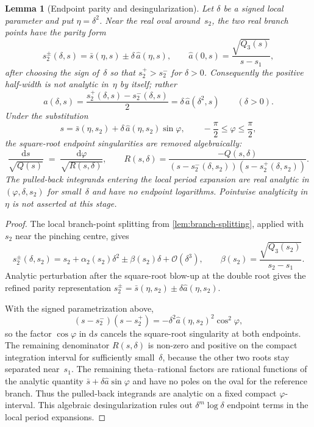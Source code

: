 \documentclass[11pt,a4paper]{article}
\theoremstyle{plain}
\newtheorem{lemma}[theorem]{Lemma}
\theoremstyle{definition}
\theoremstyle{remark}
\newcommand{\dd}{\mathrm{d}}
\newcommand{\Oo}{\mathcal{O}}
\begin{document}
\begin{lemma}[Endpoint parity and desingularization]%
\label{lem:smooth}
  Let $\delta$ be a signed local parameter and put $\eta=\delta^2$.
  Near the real oval around~$s_2$, the two real branch points have
  the parity form
  \[
    s_2^\pm(\delta,s)
    =
    \bar s(\eta,s)\pm\delta\,\widehat a(\eta,s),
    \qquad
    \widehat a(0,s)=\frac{\sqrt{Q_3(s)}}{s-s_1},
  \]
  after choosing the sign of~$\delta$ so that
  $s_2^+>s_2^-$ for $\delta>0$.  Consequently the positive
  half-width is not analytic in~$\eta$ by itself; rather
  \[
    a(\delta,s)=\frac{s_2^+(\delta,s)-s_2^-(\delta,s)}{2}
    =\delta\,\widehat a(\delta^2,s)
    \qquad(\delta>0).
  \]
  Under the substitution
  \[
    s=\bar s(\eta,s_2)+\delta\,\widehat a(\eta,s_2)\sin\varphi,
    \qquad -\frac{\pi}{2}\le\varphi\le\frac{\pi}{2},
  \]
  the square-root endpoint singularities are removed algebraically:
  \begin{equation}\label{eq:desing-factorisation}
    \frac{\dd s}{\sqrt{Q(s)}}
    \;=\;
    \frac{\dd\varphi}{\sqrt{R(s,\delta)}},
    \qquad
    R(s,\delta)
    =
    \frac{-Q(s,\delta)}
         {(s-s_2^-(\delta,s_2))(s-s_2^+(\delta,s_2))}.
  \end{equation}
  The pulled-back integrands entering the local period expansion are
  real analytic in $(\varphi,\delta,s_2)$ for small~$\delta$ and have
  no endpoint logarithms.  Pointwise analyticity in~$\eta$ is not
  asserted at this stage.
\end{lemma}

\begin{proof}
  The local branch-point splitting from
  \cref{lem:branch-splitting}, applied with $s_2$ near the pinching
  centre, gives
  \[
    s_2^\pm(\delta,s_2)
    =
    s_2+\alpha_2(s_2)\delta^2
    \pm \beta(s_2)\delta+\Oo(\delta^3),
    \qquad
    \beta(s_2)=\frac{\sqrt{Q_3(s_2)}}{s_2-s_1}.
  \]
  Analytic perturbation after the square-root blow-up at the double
  root gives the refined parity representation
  $s_2^\pm=\bar s(\eta,s_2)\pm\delta\widehat a(\eta,s_2)$.

  With the signed parametrization above,
  \[
    (s-s_2^-)(s-s_2^+)
    =
    -\delta^2\widehat a(\eta,s_2)^2\cos^2\!\varphi,
  \]
  so the factor $\cos\varphi$ in $\dd s$ cancels the square-root
  singularity at both endpoints.  The remaining denominator
  $R(s,\delta)$ is non-zero and positive on the compact integration
  interval for sufficiently small~$\delta$, because the other two
  roots stay separated near~$s_1$.  The remaining theta--rational
  factors are rational functions of the analytic quantity
  $\bar s+\delta\widehat a\sin\varphi$ and have no poles on the oval
  for the reference branch.  Thus the pulled-back integrands are
  analytic on a fixed compact $\varphi$-interval.  This algebraic
  desingularization rules out $\delta^{m}\log\delta$ endpoint terms
  in the local period expansions.
\end{proof}
\end{document}
